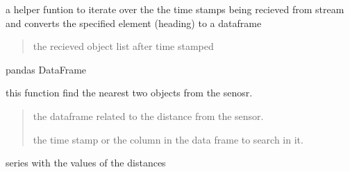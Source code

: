 \documentclass[letterpaper,10pt,english]{sphinxmanual}
\begin{document}

\begin{fulllineitems}
\label{\detokenize{processing:processing.utils.get_hed_df}}
\pysigstartsignatures
{}
\pysigstopsignatures\begin{description}
\sphinxAtStartPar
a helper funtion to iterate over the the time stamps being recieved from stream
and converts the specified element (heading) to a dataframe

\begin{quote}\begin{description}
\sphinxAtStartPar
the recieved object list after time stamped

\end{description}\end{quote}

\sphinxAtStartPar
pandas DataFrame

\end{description}

\end{fulllineitems}


\begin{fulllineitems}
\label{\detokenize{processing:processing.utils.get_nearest_from_sensor}}
\pysigstartsignatures
{}
\pysigstopsignatures\begin{description}
\sphinxAtStartPar
this function find the nearest two objects from the senosr.

\begin{quote}\begin{description}
\sphinxAtStartPar
the dataframe related to the distance from the sensor.

\sphinxAtStartPar
the time stamp or the column in the data frame to search in it.

\end{description}\end{quote}

\sphinxAtStartPar
series with the values of the distances

\end{description}

\end{fulllineitems}
\end{document}
